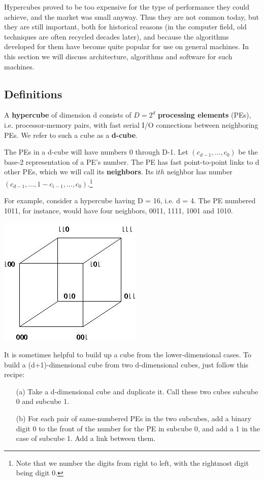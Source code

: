 Hypercubes proved to be too expensive for the type of performance they
could achieve, and the market was small anyway.  Thus they are not
common today, but they are still important, both for historical reasons
(in the computer field, old techniques are often recycled decades
later), and because the algorithms developed for them have become quite
popular for use on general machines.  In this section we will discuss
architecture, algorithms and software for such machines.

\subsection{Definitions}

A \textbf{hypercube} of dimension d consists of \( D=2^{d} \)
\textbf{processing elements} (PEs), i.e. processor-memory pairs, with
fast serial I/O connections between neighboring PEs.  We
refer to such a cube as a \textbf{d-cube}.

The PEs in a d-cube will have numbers 0 through D-1. Let \(
(c_{d-1},...,c_{0}) \) be the base-2 representation of a PE's number.
The PE has fast point-to-point links to d other PEs, which we will call
its \textbf{neighbors}. Its i$th$ neighbor has number \(
(c_{d-1},...,1-c_{i-1},...,c_{0}) \).\footnote{Note that we number the
digits from right to left, with the rightmost digit being digit 0.}

For example, consider a hypercube having D = 16, i.e. d = 4. The PE
numbered 1011, for instance, would have four neighbors, 0011, 1111, 1001
and 1010. 

\includegraphics{Images/8cube.jpg} 

It is sometimes helpful to build up a cube from the lower-dimensional
cases.  To build a (d+1)-dimensional cube from two d-dimensional cubes,
just follow this recipe:

\begin{itemize}

\item [(a)] Take a d-dimensional cube and duplicate it. Call these two
cubes subcube 0 and subcube 1. 

\item [(b)] For each pair of same-numbered PEs in the two subcubes, add a
binary digit 0 to the front of the number for the PE in subcube 0, and
add a 1 in the case of subcube 1. Add a link between them. 

\end{itemize}


